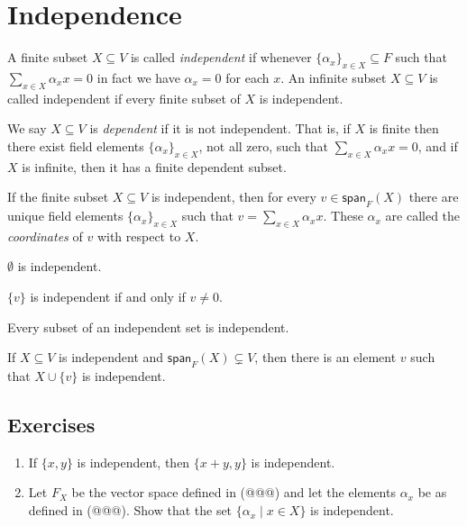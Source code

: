 \section{Independence}

\begin{dfn}
A finite subset $X \subseteq V$ is called \emph{independent} if whenever $\{\alpha_x\}_{x \in X} \subseteq F$ such that $\sum_{x \in X} \alpha_x x = 0$ in fact we have $\alpha_x = 0$ for each $x$. An infinite subset $X \subseteq V$ is called independent if every finite subset of $X$ is independent.

We say $X \subseteq V$ is \emph{dependent} if it is not independent. That is, if $X$ is finite then there exist field elements $\{\alpha_x\}_{x \in X}$, not all zero, such that $\sum_{x \in X} \alpha_x x = 0$, and if $X$ is infinite, then it has a finite dependent subset.
\end{dfn}

\begin{prp}
If the finite subset $X \subseteq V$ is independent, then for every $v \in \mathsf{span}_F(X)$ there are unique field elements $\{\alpha_x\}_{x \in X}$ such that $v = \sum_{x \in X} \alpha_x x$. These $\alpha_x$ are called the \emph{coordinates} of $v$ with respect to $X$.
\end{prp}

\begin{prp}
\begin{enumerate*}
\item $\emptyset$ is independent.
\item $\{v\}$ is independent if and only if $v \neq 0$.
\item Every subset of an independent set is independent.
\item If $X \subseteq V$ is independent and $\mathsf{span}_F(X) \subsetneq V$, then there is an element $v$ such that $X \cup \{v\}$ is independent.
\end{enumerate*}
\end{prp}

\subsection*{Exercises}

\begin{enumerate}
\item If $\{x,y\}$ is independent, then $\{x+y,y\}$ is independent.

\item Let $F_X$ be the vector space defined in (@@@) and let the elements $\alpha_x$ be as defined in (@@@). Show that the set $\{\alpha_x \mid x \in X\}$ is independent.
\end{enumerate}
